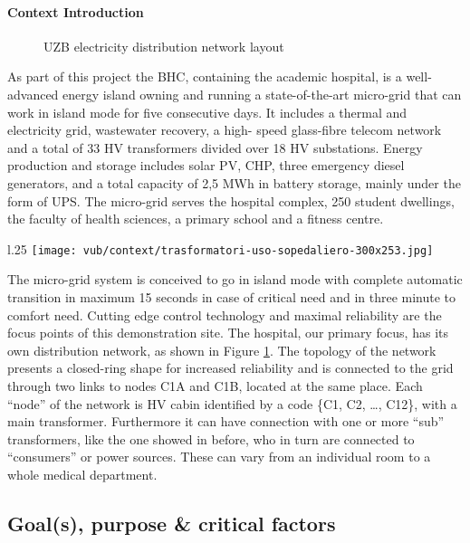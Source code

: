 \paragraph{Context Introduction}
\begin{figure}[ht]
    \caption{\acs{UZB} electricity distribution network layout}
    \label{fig:bhc_site_layout}
\end{figure}
As part of this project the \ac{BHC}, containing the academic hospital, is a well-advanced
energy island owning and running a state-of-the-art micro-grid that can work in island mode for five consecutive days. 
It includes a thermal and electricity grid, wastewater recovery, a high-
speed glass-fibre telecom network and a total of 33 \ac{HV} transformers divided over 18 \ac{HV} substations.
Energy production and storage includes solar PV, \ac{CHP}, three emergency diesel generators,
and a total capacity of 2,5 MWh in battery storage, mainly under the form of UPS.
The micro-grid serves the hospital complex, 250 student dwellings, the faculty of health
sciences, a primary school and a fitness centre. 
\begin{wrapfigure}{l}{.25\textwidth}
    \centering
    \texttt{[image: vub/context/trasformatori-uso-sopedaliero-300x253.jpg]}
\end{wrapfigure}
The micro-grid system is conceived to go in island mode with complete automatic transition in maximum 15 seconds 
in case of critical need and in three minute to comfort need. 
Cutting edge control technology and maximal reliability are the focus points of this demonstration site.
The hospital, our primary focus, has its own distribution network, as shown in Figure \ref{fig:bhc_site_layout}.
The topology of the network presents a closed-ring shape for increased reliability and is connected to the grid 
through two links to nodes C1A and C1B, located at the same place. Each ``node'' of the network is \ac{HV} cabin identified by a code \{C1, C2, \dots, C12\}, with a main transformer.
Furthermore it can have connection with one or more ``sub'' transformers, like the one showed in before, 
who in turn are connected to ``consumers'' or power sources. These can vary from an individual room to a whole medical department.

\subsection{Goal(s), purpose \& critical factors}
